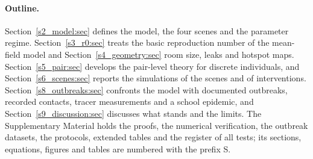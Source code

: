 \paragraph{Outline.}
Section~\ref{s2_model:sec} defines the model, the four scenes and the parameter regime.
Section~\ref{s3_r0:sec} treats the basic reproduction number of the mean-field model and
Section~\ref{s4_geometry:sec} room size, leaks and hotspot maps. Section~\ref{s5_pair:sec} develops the
pair-level theory for discrete individuals, and Section~\ref{s6_scenes:sec} reports the simulations of the
scenes and of interventions. Section~\ref{s8_outbreaks:sec} confronts the model with documented outbreaks,
recorded contacts, tracer measurements and a school epidemic, and Section~\ref{s9_discussion:sec} discusses
what stands and the limits. The Supplementary Material holds the proofs, the numerical verification, the
outbreak datasets, the protocols, extended tables and the register of all tests; its sections, equations,
figures and tables are numbered with the prefix S.

